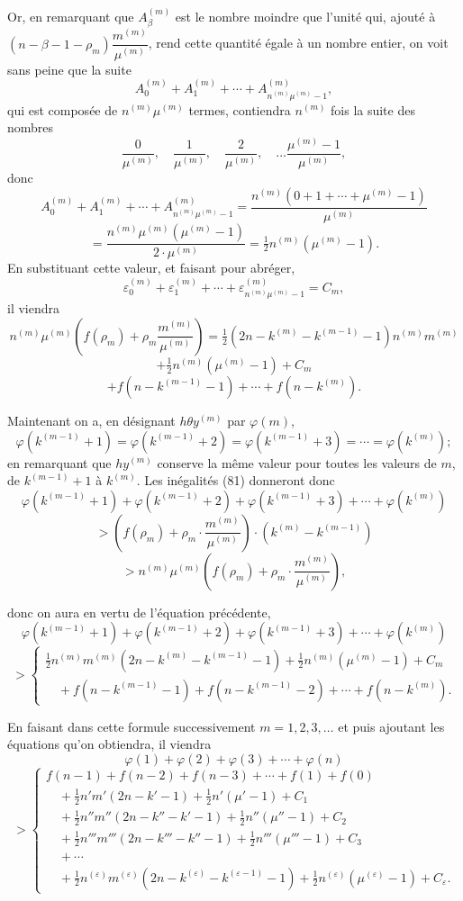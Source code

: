 \documentclass{article}
\begin{document}
Or, en remarquant que $A_\beta^{(m)}$ est le nombre moindre que l'unité qui, ajouté à $(n-\beta-1-\rho_m)\dfrac{m^{(m)}}{\mu^{(m)}}$, rend cette quantité égale à un nombre entier, on voit sans peine que la suite
\[ A_0^{(m)} + A_1^{(m)} + \cdots + A_{n^{(m)}\mu^{(m)}-1}^{(m)}, \]
qui est composée de $n^{(m)}\mu^{(m)}$ termes, contiendra $n^{(m)}$ fois la suite des nombres
\[ \frac{0}{\mu^{(m)}}, \quad \frac{1}{\mu^{(m)}}, \quad \frac{2}{\mu^{(m)}}, \quad \ldots \frac{\mu^{(m)}-1}{\mu^{(m)}}, \]
donc
\[ A_0^{(m)}+A_1^{(m)}+\cdots+A_{n^{(m)}\mu^{(m)}-1}^{(m)} = \frac{n^{(m)}(0+1+\cdots+\mu^{(m)}-1)}{\mu^{(m)}} \]
\[ = \frac{n^{(m)}\mu^{(m)}(\mu^{(m)}-1)}{2 \cdot \mu^{(m)}} = \tfrac{1}{2}n^{(m)}(\mu^{(m)}-1). \tag{85} \]
En substituant cette valeur, et faisant pour abréger,
\[ \varepsilon_0^{(m)}+\varepsilon_1^{(m)}+\cdots+\varepsilon_{n^{(m)}\mu^{(m)}-1}^{(m)} = C_m, \]
il viendra
\[ n^{(m)}\mu^{(m)}\left(f(\rho_m)+\rho_m\frac{m^{(m)}}{\mu^{(m)}}\right) = \tfrac{1}{2}(2n-k^{(m)}-k^{(m-1)}-1)n^{(m)}m^{(m)} \]
\[ + \tfrac{1}{2}n^{(m)}(\mu^{(m)}-1) + C_m \]
\[ + f(n-k^{(m-1)}-1)+\cdots+f(n-k^{(m)}). \tag{86} \]

Maintenant on a, en désignant $h\theta y^{(m)}$ par $\varphi(m)$,
\[ \varphi(k^{(m-1)}+1) = \varphi(k^{(m-1)}+2) = \varphi(k^{(m-1)}+3) = \cdots = \varphi(k^{(m)}); \tag{87} \]
en remarquant que $hy^{(m)}$ conserve la même valeur pour toutes les valeurs de $m$, de $k^{(m-1)}+1$ à $k^{(m)}$. Les inégalités (81) donneront donc
\[ \varphi(k^{(m-1)}+1)+\varphi(k^{(m-1)}+2)+\varphi(k^{(m-1)}+3)+\cdots+\varphi(k^{(m)}) \]
\[ > \left(f(\rho_m)+\rho_m \cdot \frac{m^{(m)}}{\mu^{(m)}}\right) \cdot (k^{(m)}-k^{(m-1)}) \]
\[ > n^{(m)}\mu^{(m)}\left(f(\rho_m)+\rho_m \cdot \frac{m^{(m)}}{\mu^{(m)}}\right), \]

donc on aura en vertu de l'équation précédente,
\[ \varphi(k^{(m-1)}+1)+\varphi(k^{(m-1)}+2)+\varphi(k^{(m-1)}+3)+\cdots+\varphi(k^{(m)}) \]
\[ > \begin{cases} \tfrac{1}{2}n^{(m)}m^{(m)}(2n-k^{(m)}-k^{(m-1)}-1) + \tfrac{1}{2}n^{(m)}(\mu^{(m)}-1) + C_m \\ \quad + f(n-k^{(m-1)}-1)+f(n-k^{(m-1)}-2)+\cdots+f(n-k^{(m)}). \end{cases} \]

En faisant dans cette formule successivement $m = 1, 2, 3, \ldots$ et puis ajoutant les équations qu'on obtiendra, il viendra
\[ \varphi(1) + \varphi(2) + \varphi(3) + \cdots + \varphi(n) \]
\[ > \begin{cases}
f(n-1)+f(n-2)+f(n-3)+\cdots+f(1)+f(0) \\
\quad + \tfrac{1}{2}n'm'(2n-k'-1) + \tfrac{1}{2}n'(\mu'-1) + C_1 \\
\quad + \tfrac{1}{2}n''m''(2n-k''-k'-1) + \tfrac{1}{2}n''(\mu''-1) + C_2 \\
\quad + \tfrac{1}{2}n'''m'''(2n-k'''-k''-1) + \tfrac{1}{2}n'''(\mu'''-1) + C_3 \\
\quad + \cdots \\
\quad + \tfrac{1}{2}n^{(\varepsilon)}m^{(\varepsilon)}(2n-k^{(\varepsilon)}-k^{(\varepsilon-1)}-1) + \tfrac{1}{2}n^{(\varepsilon)}(\mu^{(\varepsilon)}-1) + C_\varepsilon.
\end{cases} \]
\end{document}
